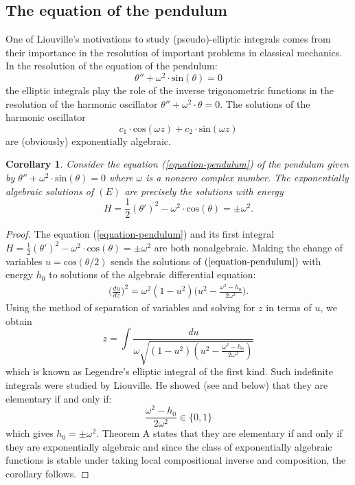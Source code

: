 \documentclass[12pt]{amsart}
\theoremstyle{definition}
\theoremstyle{plain}
\newtheorem{cor}[defn]{Corollary}
\theoremstyle{exampstyle}\newtheorem{thmx}{Theorem}
\theoremstyle{exampstyle}\newtheorem{thmxbis}{Theorem}
\begin{document}
\subsection{The equation of the pendulum} One of Liouville's motivations to study (pseudo)-elliptic integrals comes from their importance in the resolution of important problems in classical mechanics. In the resolution of the equation of the pendulum:
\begin{equation}\label{equation-pendulum}
\theta'' + \omega^2 \cdot \mathrm{sin}(\theta) = 0
\end{equation}
the elliptic integrals play the role of the inverse trigonometric functions in the resolution of the harmonic oscillator $\theta'' + \omega^2 \cdot \theta = 0$. The solutions of the harmonic oscillator
$$ c_1 \cdot \mathrm{cos}(\omega z) + c_2 \cdot \mathrm{sin}(\omega z) $$
are (obviously) exponentially algebraic.
\begin{cor} \label{cor-pendulum}
Consider the equation (\ref{equation-pendulum}) of the pendulum given by $\theta'' + \omega^2 \cdot \mathrm{sin}(\theta) = 0$ where $\omega$ is a nonzero complex number.  The exponentially algebraic solutions of $(E)$  are precisely the solutions with energy
$$H = \frac 1 2 (\theta')^2 - \omega^2 \cdot \mathrm{cos}(\theta) = \pm \omega^2.$$
\end{cor} 



\begin{proof} 
The equation (\ref{equation-pendulum}) and its first integral $H = \frac 1 2 (\theta')^2 - \omega^2 \cdot \mathrm{cos}(\theta) = \pm \omega^2$ are both nonalgebraic. Making the change of variables $u = \mathrm{cos}(\theta/2)$ sends the solutions of $(\ref{equation-pendulum})$ with energy $h_0$ to solutions of the algebraic differential equation: 
\begin{eqnarray} \label{equation-pseudo-elliptic}
 \Big(\frac{du}{dz}\Big)^2 = \omega^2(1-u^2)\Big(u^2 - \frac{\omega^2-h_0}{2\omega^2}\Big).
 \end{eqnarray}
Using the method of separation of variables and solving for $z$ in terms of $u$, we obtain 
$$ z = \int \frac{du}{\omega \sqrt{(1-u^2)(u^2 - \frac{\omega^2-h_0}{2\omega^2})}}$$
which is known as Legendre's elliptic integral of the first kind. Such indefinite integrals were studied by Liouville. He showed (see \cite[p.35]{Ritt-book} and below) that they are elementary if and only if:
\begin{equation}\label{equation-8}
 \frac{\omega^2-h_0}{2\omega^2} \in \lbrace 0,1 \rbrace
 \end{equation} 
which gives $h_0 = \pm \omega^2$. Theorem A states that they are elementary if and only if they are exponentially algebraic and since the class of exponentially algebraic functions is stable under taking local compositional inverse and composition, the corollary follows. 
\end{proof} 
\end{document}
